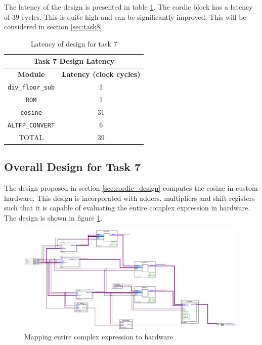 \documentclass{article}
\begin{document}
The latency of the design is presented in table \ref{tab:task7_design_latency}. The cordic block has a latency of $39$ cycles. This is quite high and can be significantly improved. This will be considered in section \ref{sec:task8}.

\begin{table}[H]
  \centering
    \begin{tabular}{|c|c|}
    \hline
    \multicolumn{2}{|c|}{\textbf{Task 7 Design Latency}} \\
    \hline
    \textbf{Module} & \textbf{Latency (clock cycles)} \\
    \hline
    {\tt div\_floor\_sub} & 1 \\
    \hline
    {\tt ROM}   & 1 \\
    \hline
    {\tt cosine} & 31 \\
    \hline
    {\tt ALTFP\_CONVERT} & 6 \\
    \hline
    TOTAL & 39 \\
    \hline
    \end{tabular} 
    \caption{Latency of design for task 7}
    \label{tab:task7_design_latency}
\end{table}%

\newpage
\subsection{Overall Design for Task 7}\label{sec:task7_overall}
The design proposed in section \ref{sec:cordic_design} computes the cosine in custom hardware. This design is incorporated with adders, multipliers and shift registers such that it is capable of evaluating the entire complex expression in hardware. The design is shown in figure \ref{fig:task7_bdf_2}.

\begin{figure}[H]
    \centering
    \includegraphics[width = 0.99\textwidth]{task7_bdf_2}
    \caption{Mapping entire complex expression to hardware}
    \label{fig:task7_bdf_2}
\end{figure}
\end{document}
